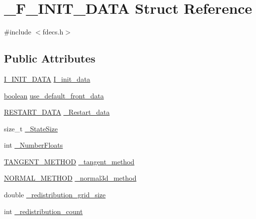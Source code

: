 \hypertarget{struct___f___i_n_i_t___d_a_t_a}{}\section{\+\_\+\+F\+\_\+\+I\+N\+I\+T\+\_\+\+D\+A\+TA Struct Reference}
\label{struct___f___i_n_i_t___d_a_t_a}


{\ttfamily \#include $<$fdecs.\+h$>$}

\subsection*{Public Attributes}
\begin{DoxyCompactItemize}
\item 
\hyperlink{int_8h_afa5f301bb0b0380f47dbc718325d31a0}{I\+\_\+\+I\+N\+I\+T\+\_\+\+D\+A\+TA} \hyperlink{struct___f___i_n_i_t___d_a_t_a_adfceb8fd3cc922dfeec9f20223d0bf77}{I\+\_\+init\+\_\+data}
\item 
\hyperlink{cdecs_8h_ad048433382a936258fb49e2ec4f148e1}{boolean} \hyperlink{struct___f___i_n_i_t___d_a_t_a_adb6d275bbd4e0c485102a481e9c9664a}{use\+\_\+default\+\_\+front\+\_\+data}
\item 
\hyperlink{fdecs_8h_a03d47d9215c5eba3e1efa6f6a4ac5927}{R\+E\+S\+T\+A\+R\+T\+\_\+\+D\+A\+TA} \hyperlink{struct___f___i_n_i_t___d_a_t_a_a3b624d192027044c0454362c5f02a665}{\+\_\+\+Restart\+\_\+data}
\item 
size\+\_\+t \hyperlink{struct___f___i_n_i_t___d_a_t_a_a08512dcd30501bca9fbc79c445b2a075}{\+\_\+\+State\+Size}
\item 
int \hyperlink{struct___f___i_n_i_t___d_a_t_a_a759a97da8a98a43cc4a37dae1a437d4e}{\+\_\+\+Number\+Floats}
\item 
\hyperlink{fdecs_8h_aa9c5eadb567c98d3f5fcb5eb46450d72}{T\+A\+N\+G\+E\+N\+T\+\_\+\+M\+E\+T\+H\+OD} \hyperlink{struct___f___i_n_i_t___d_a_t_a_af7c5261566d0e9a519cc5edbd5c29a88}{\+\_\+tangent\+\_\+method}
\item 
\hyperlink{fdecs_8h_a0091fc912d97a7e23c645557949aa316}{N\+O\+R\+M\+A\+L\+\_\+\+M\+E\+T\+H\+OD} \hyperlink{struct___f___i_n_i_t___d_a_t_a_ac2d1c949758459a24954f74ce944b1e1}{\+\_\+normal3d\+\_\+method}
\item 
double \hyperlink{struct___f___i_n_i_t___d_a_t_a_ab72482b00da2fc5f0714d27cd8f454b1}{\+\_\+redistribution\+\_\+grid\+\_\+size}
\item 
int \hyperlink{struct___f___i_n_i_t___d_a_t_a_adbd8cea267d62fa3d76399e3aa7a66f8}{\+\_\+redistribution\+\_\+count}

\end{DoxyCompactItemize}
